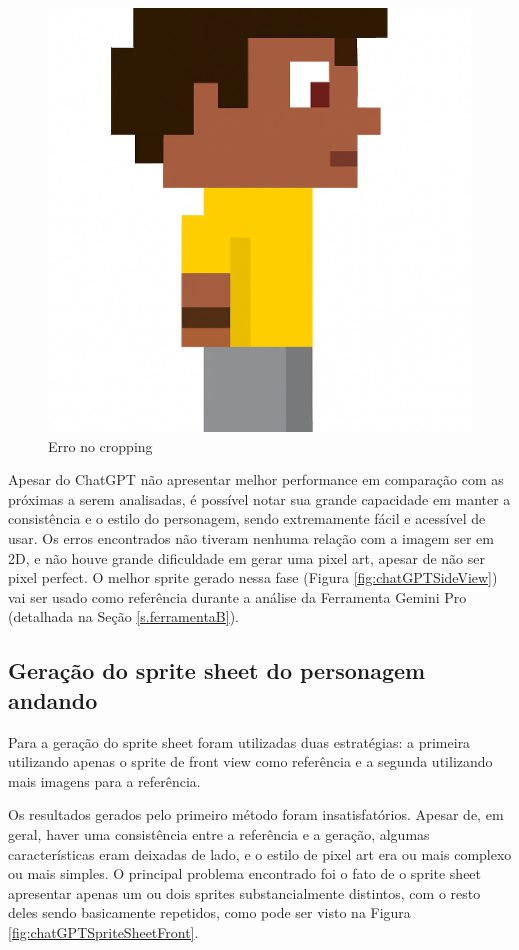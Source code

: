 \begin{figure}[htbp]
    \centering
    \caption{\small Erro no cropping}
    \label{fig:chatGPTCropping}
    \includegraphics[width=0.3\linewidth]{figs/chatGPT/visao_lateral/res4.png}
\end{figure}

Apesar do ChatGPT não apresentar melhor performance em comparação com as próximas a serem analisadas, é possível notar sua grande capacidade em manter a consistência e o estilo do personagem, sendo extremamente fácil e acessível de usar. Os erros encontrados não tiveram nenhuma relação com a imagem ser em 2D, e não houve grande dificuldade em gerar uma pixel art, apesar de não ser pixel perfect. O melhor sprite gerado nessa fase (Figura \ref{fig:chatGPTSideView}) vai ser usado como referência durante a análise da Ferramenta Gemini Pro (detalhada na Seção \ref{s.ferramentaB}).


\FloatBarrier
\subsection{Geração do sprite sheet do personagem andando}
\label{s.chatGPT.spriteSheet}

Para a geração do sprite sheet foram utilizadas duas estratégias: a primeira utilizando apenas o sprite de front view como referência e a segunda utilizando mais imagens para a referência.

Os resultados gerados pelo primeiro método foram insatisfatórios. Apesar de, em geral, haver uma consistência entre a referência e a geração, algumas características eram deixadas de lado, e o estilo de pixel art era ou mais complexo ou mais simples. O principal problema encontrado foi o fato de o sprite sheet apresentar apenas um ou dois sprites substancialmente distintos, com o resto deles sendo basicamente repetidos, como pode ser visto na Figura \ref{fig:chatGPTSpriteSheetFront}.

